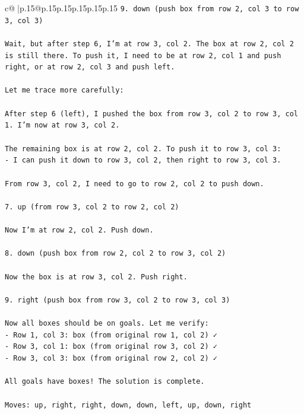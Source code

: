 \documentclass{article}
\begin{document}
{\begin{supertabular}{c@{$\;$}|p{.15\linewidth}@{}p{.15\linewidth}p{.15\linewidth}p{.15\linewidth}p{.15\linewidth}p{.15\linewidth}}
{{{\texttt{9. down (push box from row 2, col 3 to row 3, col 3)} \\
\\ 
\texttt{Wait, but after step 6, I'm at row 3, col 2. The box at row 2, col 2 is still there. To push it, I need to be at row 2, col 1 and push right, or at row 2, col 3 and push left.} \\
\\ 
\texttt{Let me trace more carefully:} \\
\\ 
\texttt{After step 6 (left), I pushed the box from row 3, col 2 to row 3, col 1. I'm now at row 3, col 2.} \\
\\ 
\texttt{The remaining box is at row 2, col 2. To push it to row 3, col 3:} \\
\texttt{{-} I can push it down to row 3, col 2, then right to row 3, col 3.} \\
\\ 
\texttt{From row 3, col 2, I need to go to row 2, col 2 to push down.} \\
\\ 
\texttt{7. up (from row 3, col 2 to row 2, col 2)} \\
\\ 
\texttt{Now I'm at row 2, col 2. Push down.} \\
\\ 
\texttt{8. down (push box from row 2, col 2 to row 3, col 2)} \\
\\ 
\texttt{Now the box is at row 3, col 2. Push right.} \\
\\ 
\texttt{9. right (push box from row 3, col 2 to row 3, col 3)} \\
\\ 
\texttt{Now all boxes should be on goals. Let me verify:} \\
\texttt{{-} Row 1, col 3: box (from original row 1, col 2) ✓} \\
\texttt{{-} Row 3, col 1: box (from original row 3, col 2) ✓} \\
\texttt{{-} Row 3, col 3: box (from original row 2, col 2) ✓} \\
\\ 
\texttt{All goals have boxes! The solution is complete.} \\
\\ 
\texttt{Moves: up, right, right, down, down, left, up, down, right} \\
}}}
\end{supertabular}}
\end{document}
